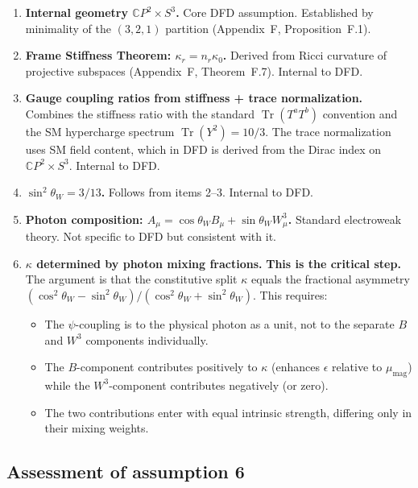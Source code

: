 \documentclass[aps,prd,twocolumn,superscriptaddress,nofootinbib]{revtex4-2}
\newcommand{\CP}{\mathbb{C}P}
\newcommand{\Tr}{\operatorname{Tr}}
\begin{document}
\begin{enumerate}
\item \textbf{Internal geometry $\CP^2 \times S^3$.}
Core DFD assumption.  Established by minimality of the $(3,2,1)$ partition
(Appendix~F, Proposition~F.1).

\item \textbf{Frame Stiffness Theorem: $\kappa_r = n_r \kappa_0$.}
Derived from Ricci curvature of projective subspaces
(Appendix~F, Theorem~F.7).  Internal to DFD.

\item \textbf{Gauge coupling ratios from stiffness + trace normalization.}
Combines the stiffness ratio with the standard $\Tr(T^a T^b)$ convention
and the SM hypercharge spectrum $\Tr(Y^2) = 10/3$.  The trace normalization
uses SM field content, which in DFD is derived from the Dirac index on
$\CP^2 \times S^3$.  Internal to DFD.

\item \textbf{$\sin^2\theta_W = 3/13$.}
Follows from items 2--3.  Internal to DFD.

\item \textbf{Photon composition: $A_\mu = \cos\theta_W B_\mu + \sin\theta_W W^3_\mu$.}
Standard electroweak theory.  Not specific to DFD but consistent with it.

\item \textbf{$\kappa$ determined by photon mixing fractions.}
\textbf{This is the critical step.}  The argument is that the constitutive
split $\kappa$ equals the fractional asymmetry
$(\cos^2\theta_W - \sin^2\theta_W)/(\cos^2\theta_W + \sin^2\theta_W)$.
This requires:
\begin{itemize}
\item[(a)] The $\psi$-coupling is to the physical photon as a unit,
  not to the separate $B$ and $W^3$ components individually.
\item[(b)] The $B$-component contributes positively to $\kappa$
  (enhances $\epsilon$ relative to $\mu_{\mathrm{mag}}$) while the
  $W^3$-component contributes negatively (or zero).
\item[(c)] The two contributions enter with equal intrinsic strength,
  differing only in their mixing weights.
\end{itemize}
\end{enumerate}

\subsection{Assessment of assumption 6}
\end{document}
